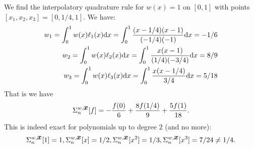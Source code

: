 \begin{example} We find the interpolatory quadrature rule for $w(x) = 1$ on $[0,1]$ with  points $[x_1,x_2,x_3] = [0,1/4,1]$. We have:
\begin{align*}
w_1 = \int_0^1 w(x) \ensuremath{\ell}_1(x) {\rm d}x  = \int_0^1 {(x-1/4)(x-1) \over (-1/4)(-1)}{\rm d}x = -1/6 \\
w_2 = \int_0^1 w(x) \ensuremath{\ell}_2(x) {\rm d}x  = \int_0^1 {x(x-1) \over (1/4)(-3/4)}{\rm d}x = 8/9 \\
w_3 = \int_0^1 w(x) \ensuremath{\ell}_3(x) {\rm d}x  = \int_0^1 {x(x-1/4) \over 3/4}{\rm d}x = 5/18
\end{align*}
That is we have
\[
\Sigma_n^{w,\bm{{\mbox{\boldmath$x$\unboldmath}}}}[f]  = -{f(0) \over 6} + {8f(1/4) \over 9} + {5 f(1) \over 18}.
\]
This is indeed exact for polynomials up to degree $2$ (and no more):
\[
\Sigma_n^{w,\bm{{\mbox{\boldmath$x$\unboldmath}}}}[1] = 1, \Sigma_n^{w,\bm{{\mbox{\boldmath$x$\unboldmath}}}}[x] = 1/2, \Sigma_n^{w,\bm{{\mbox{\boldmath$x$\unboldmath}}}}[x^2] = 1/3, \Sigma_n^{w,\bm{{\mbox{\boldmath$x$\unboldmath}}}}[x^3] = 7/24 \neq 1/4.
\]
\end{example}

